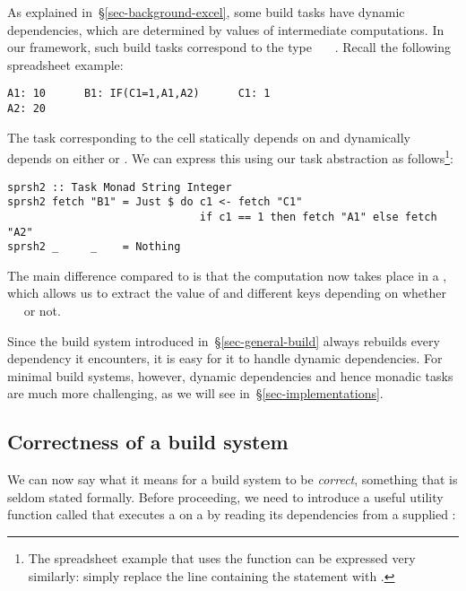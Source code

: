 As explained in~\S\ref{sec-background-excel}, some build tasks have dynamic
dependencies, which are determined by values of intermediate computations. In
our framework, such build tasks correspond to the type
~~~. Recall the following spreadsheet
example:

\vspace{1mm}
\begin{verbatim}
A1: 10      B1: IF(C1=1,A1,A2)      C1: 1
A2: 20
\end{verbatim}

\noindent
The task corresponding to the cell  statically depends on  and
dynamically depends on either  or . We can express this using
our task abstraction as follows\footnote{The spreadsheet example that uses
the  function can be expressed very similarly: simply replace the
line containing the  statement with .}:

\vspace{1mm}
\begin{verbatim}
sprsh2 :: Task Monad String Integer
sprsh2 fetch "B1" = Just $ do c1 <- fetch "C1"
                              if c1 == 1 then fetch "A1" else fetch "A2"
sprsh2 _     _    = Nothing
\end{verbatim}
\vspace{1mm}

\noindent
The main difference compared to  is that the computation now takes
place in a , which allows us to extract the value of  and
 different keys depending on whether ~\hs{==}~ or not.

Since the  build system introduced in~\S\ref{sec-general-build} always
rebuilds every dependency it encounters, it is easy for it to handle dynamic
dependencies. For minimal build systems, however, dynamic dependencies and hence
monadic tasks are much more challenging, as we will see
in~\S\ref{sec-implementations}.

\subsection{Correctness of a build system} \label{sec-build-correctness}

We can now say what it means for a build system to be \emph{correct}, something
that is seldom stated formally. Before proceeding, we need to introduce a
useful utility function called  that executes a  on a
 by reading its dependencies from a supplied :

